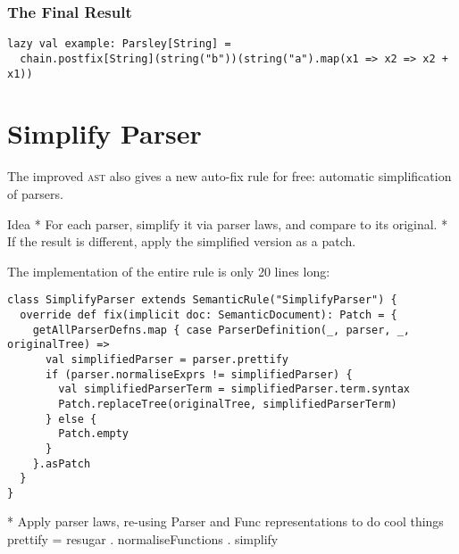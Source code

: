 \documentclass[../../main.tex]{subfiles}
\begin{document}

\subsubsection{The Final Result}
\begin{verbatim}
lazy val example: Parsley[String] =
  chain.postfix[String](string("b"))(string("a").map(x1 => x2 => x2 + x1))
\end{verbatim}

\section{Simplify Parser}
The improved  \textsc{ast} also gives a new auto-fix rule for free: automatic simplification of parsers.

Idea
* For each parser, simplify it via parser laws, and compare to its original.
* If the result is different, apply the simplified version as a patch.

The implementation of the entire rule is only 20 lines long:
\begin{verbatim}
class SimplifyParser extends SemanticRule("SimplifyParser") {
  override def fix(implicit doc: SemanticDocument): Patch = {
    getAllParserDefns.map { case ParserDefinition(_, parser, _, originalTree) =>
      val simplifiedParser = parser.prettify
      if (parser.normaliseExprs != simplifiedParser) {
        val simplifiedParserTerm = simplifiedParser.term.syntax
        Patch.replaceTree(originalTree, simplifiedParserTerm)
      } else {
        Patch.empty
      }
    }.asPatch
  }
}
\end{verbatim}
%

* Apply parser laws, re-using Parser and Func representations to do cool things
prettify = resugar . normaliseFunctions . simplify
\end{document}
